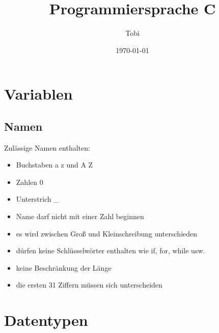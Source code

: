 \documentclass[a4paper,12pt,twoside]{article}
\title{Programmiersprache C}
\author{Tobi}
\date{\today}
\begin{document}
\maketitle
\thispagestyle{empty} %
\newpage

\tableofcontents
\newpage

\section{Variablen}
\subsection{Namen}
Zulässige Namen enthalten:
\begin{itemize}
  \item Buchstaben a \- z und A \- Z 
  \item Zahlen 0  
  \item Unterstrich \_ 
  \item Name darf nicht mit einer Zahl beginnen 
  \item es wird zwischen Groß\- und Kleinschreibung unterschieden 
  \item dürfen keine Schlüsselwörter enthalten wie if, for, while usw.
  \item keine Beschränkung der Länge 
  \item die ersten 31 Ziffern müssen sich unterscheiden
\end{itemize}

\section{Datentypen} 
\end{document}
